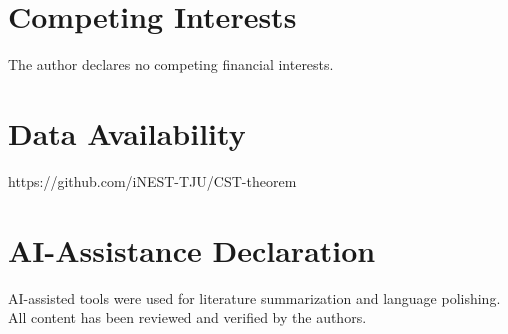 \documentclass[a4paper,12pt]{article}
\begin{document}
\section*{Competing Interests}
The author declares no competing financial interests.

\section*{Data Availability}
https://github.com/iNEST-TJU/CST-theorem

\section*{AI-Assistance Declaration}
AI-assisted tools were used for literature summarization and language polishing. All content has been reviewed and verified by the authors.
\end{document}
